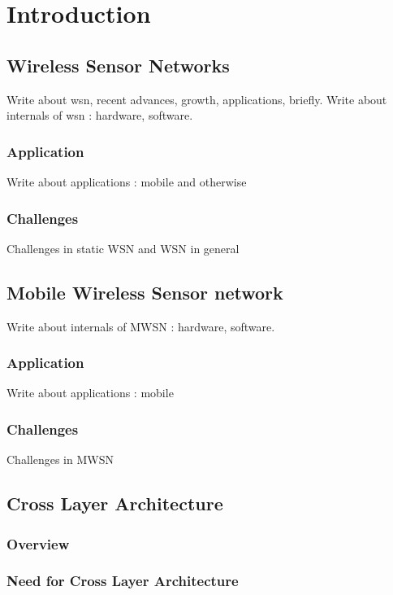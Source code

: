 
\chapter{Introduction} %

\label{intro} %



\section{Wireless Sensor Networks}

Write about wsn, recent advances, growth, applications, briefly.
Write about internals of wsn : hardware, software.

\subsection{Application}

Write about applications : mobile and otherwise

\subsection{Challenges}

Challenges in static WSN and WSN in general

\section{Mobile Wireless Sensor network}

Write about internals of MWSN : hardware, software.

\subsection{Application}

Write about applications : mobile 

\subsection{Challenges}

Challenges in MWSN

\section{Cross Layer Architecture}
\subsection{Overview}
\subsection{Need for Cross Layer Architecture}

